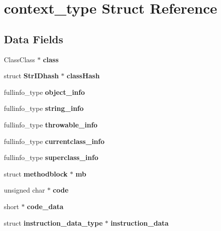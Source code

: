 \section{context\_\-type Struct Reference}
\label{structcontext__type}
\subsection*{Data Fields}
\begin{DoxyCompactItemize}
\item 
ClassClass $\ast$ {\bfseries class}\label{structcontext__type_aefce92400c1f4cafdaaa9cbd6be0c82d}

\item 
struct {\bf StrIDhash} $\ast$ {\bfseries classHash}\label{structcontext__type_a74082b90ba6ff2d01f1e72eff84ab452}

\item 
fullinfo\_\-type {\bfseries object\_\-info}\label{structcontext__type_a82752b450fe89ea1222b0dbf1b55120f}

\item 
fullinfo\_\-type {\bfseries string\_\-info}\label{structcontext__type_ade14aeebcc66c9f768e1f9fe58f6443d}

\item 
fullinfo\_\-type {\bfseries throwable\_\-info}\label{structcontext__type_ac776b9ee2efc768e1f66ed78499b6015}

\item 
fullinfo\_\-type {\bfseries currentclass\_\-info}\label{structcontext__type_ac66401852fcbcaee7d7932404e186ddd}

\item 
fullinfo\_\-type {\bfseries superclass\_\-info}\label{structcontext__type_a45cc416a262f9f963d77d2b4bb9c7e5d}

\item 
struct {\bf methodblock} $\ast$ {\bfseries mb}\label{structcontext__type_a01836ce46cebe96dfdc5fbb20420398c}

\item 
unsigned char $\ast$ {\bfseries code}\label{structcontext__type_a59cc0824161afbfa9e709faff4f184ba}

\item 
short $\ast$ {\bfseries code\_\-data}\label{structcontext__type_a3458a9e6aeac7f23d903baf2d398dc02}

\item 
struct {\bf instruction\_\-data\_\-type} $\ast$ {\bfseries instruction\_\-data}\label{structcontext__type_aed357c64cf9a94d8bed95ee8f426e3a6}


\end{DoxyCompactItemize}
